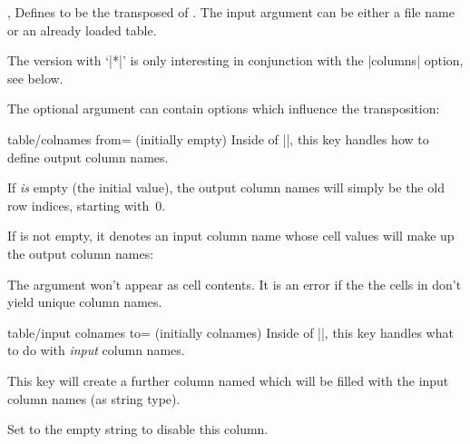 \begin{commandlist}{%
	\pgfplotstabletranspose{},%
	\pgfplotstabletranspose*{}}%
	Defines  to be the transposed of . The input argument can be either a file name or an already loaded table.

	The version with `|*|' is only interesting in conjunction with the |columns| option, see below.

\begin{codeexample}[]
\end{codeexample}

\begin{codeexample}[]
\pgfplotstabletranspose{}
\loadedtable
\end{codeexample}

	The optional argument  can contain options which influence the transposition:
	\begin{pgfplotskey}{table/colnames from= (initially empty)}
		Inside of |\pgfplotstabletranspose|, this key handles how to define output column names.
		
		If  \emph{is} empty (the initial value), the output column names will simply be the old row indices, starting with~$0$.

		If  is not empty, it denotes an input column name whose cell values will make up the output column names:
\begin{codeexample}[]
\pgfplotstabletranspose[colnames from=c]
\loadedtable
\end{codeexample}
		The argument  won't appear as cell contents. It is an error if the the cells in  don't yield unique column names.
	\end{pgfplotskey}

	\begin{pgfplotskey}{table/input colnames to= (initially colnames)}
		Inside of |\pgfplotstabletranspose|, this key handles what to do with \emph{input} column names.

		This key will create a further column named  which will be filled with the input column names (as string type).
\begin{codeexample}[]
\pgfplotstabletranspose[input colnames to=Input]
\loadedtable
\end{codeexample}
		Set  to the empty string to disable this column.
\begin{codeexample}[]
\pgfplotstabletranspose[input colnames to=]
\loadedtable
\end{codeexample}
	\end{pgfplotskey}


\end{commandlist}
